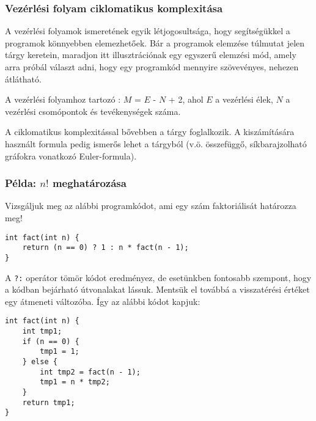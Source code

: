 \subsubsection{Vezérlési folyam ciklomatikus komplexitása}
A vezérlési folyamok ismeretének egyik létjogosultsága, hogy segítségükkel a programok könnyebben elemezhetőek. Bár a programok elemzése túlmutat jelen tárgy keretein, maradjon itt illusztrációnak egy egyszerű elemzési mód, amely arra próbál választ adni, hogy egy programkód mennyire szövevényes, nehezen átlátható. 

\begin{definicio}
A vezérlési folyamhoz tartozó : $M$ = $E$ - $N$ + 2, ahol $E$ a vezérlési élek, $N$ a vezérlési csomópontok és tevékenységek száma.
\end{definicio}


\begin{megjegyzes}
	A ciklomatikus komplexitással bővebben a \szofttech{} tárgy foglalkozik.
	A kiszámítására használt formula pedig ismerős lehet a \bszketto{} tárgyból (v.ö. összefüggő, síkbarajzolható gráfokra vonatkozó Euler-formula).
\end{megjegyzes}

\subsubsection{Példa: $n!$ meghatározása}

Vizsgáljuk meg az alábbi programkódot, ami egy szám faktoriálisát határozza meg!

\begin{lstlisting}
int fact(int n) {
	return (n == 0) ? 1 : n * fact(n - 1);
}
\end{lstlisting}

A \lstinline{?:} operátor tömör kódot eredményez, de esetünkben fontosabb szempont, hogy a kódban bejárható útvonalakat lássuk. Mentsük el továbbá a visszatérési értéket egy átmeneti változóba. Így az alábbi kódot kapjuk:

\begin{minipage}{\balhasab}
\begin{lstlisting}
int fact(int n) {
	int tmp1;
	if (n == 0) {
		tmp1 = 1;
	} else {
		int tmp2 = fact(n - 1);
		tmp1 = n * tmp2;
	}
	return tmp1;
}
\end{lstlisting}
\end{minipage}
\begin{minipage}{\jobbhasab}
\end{minipage}


